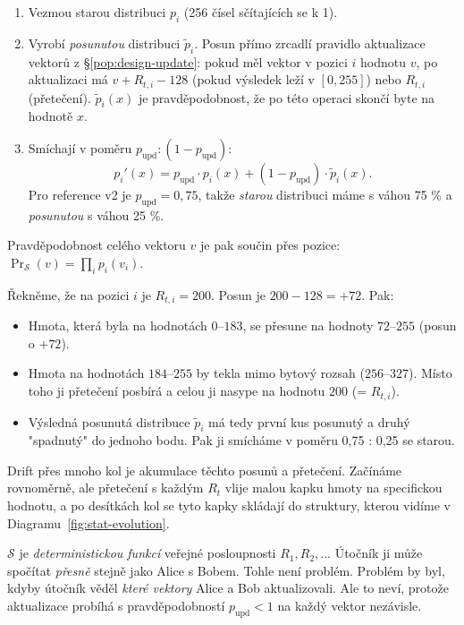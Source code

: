 \documentclass[11pt,a4paper]{article}
\begin{document}
\begin{enumerate}[leftmargin=*]
\item Vezmou starou distribuci $p_i$ (256 čísel sčítajících se k 1).
\item Vyrobí \emph{posunutou} distribuci $\tilde{p}_i$. Posun přímo zrcadlí pravidlo aktualizace vektorů z §\ref{pop:design-update}: pokud měl vektor v pozici $i$ hodnotu $v$, po aktualizaci má $v + R_{t,i} - 128$ (pokud výsledek leží v $[0, 255]$) nebo $R_{t,i}$ (přetečení). $\tilde{p}_i(x)$ je pravděpodobnost, že po této operaci skončí byte na hodnotě $x$.
\item Smíchají v poměru $p_\text{upd} : (1 - p_\text{upd})$:
\[
p_i'(x) = p_\text{upd} \cdot p_i(x) + (1 - p_\text{upd}) \cdot \tilde{p}_i(x).
\]
Pro reference v2 je $p_\text{upd} = 0{,}75$, takže \emph{starou} distribuci máme s váhou 75 \% a \emph{posunutou} s váhou 25 \%.
\end{enumerate}

Pravděpodobnost celého vektoru $v$ je pak součin přes pozice: $\Pr_\mathcal{S}(v) = \prod_i p_i(v_i)$.

\begin{sidebar}
Řekněme, že na pozici $i$ je $R_{t,i} = 200$. Posun je $200 - 128 = +72$. Pak:
\begin{itemize}[leftmargin=*]
\item Hmota, která byla na hodnotách $0$--$183$, se přesune na hodnoty $72$--$255$ (posun o $+72$).
\item Hmota na hodnotách $184$--$255$ by tekla mimo bytový rozsah ($256$--$327$). Místo toho ji přetečení posbírá a celou ji nasype na hodnotu $200$ (= $R_{t,i}$).
\item Výsledná posunutá distribuce $\tilde{p}_i$ má tedy první kus posunutý a druhý "spadnutý" do jednoho bodu. Pak ji smícháme v poměru 0,75 : 0,25 se starou.
\end{itemize}
Drift přes mnoho kol je akumulace těchto posunů a přetečení. Začínáme rovnoměrně, ale přetečení s každým $R_t$ vlije malou kapku hmoty na specifickou hodnotu, a po desítkách kol se tyto kapky skládají do struktury, kterou vidíme v Diagramu~\ref{fig:stat-evolution}.
\end{sidebar}

\begin{aha}
$\mathcal{S}$ je \emph{deterministickou funkcí} veřejné posloupnosti $R_1, R_2, \ldots$ Útočník ji může spočítat \emph{přesně} stejně jako Alice s Bobem. Tohle není problém. Problém by byl, kdyby útočník věděl \emph{které vektory} Alice a Bob aktualizovali. Ale to neví, protože aktualizace probíhá s pravděpodobností $p_\text{upd} < 1$ na každý vektor nezávisle.
\end{aha}
\end{document}
